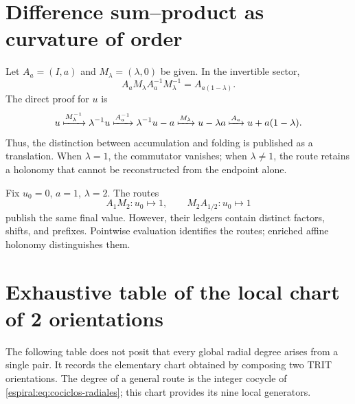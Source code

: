 \section{Difference sum--product as curvature of order}

Let \(A_a=(I,a)\) and \(M_\lambda=(\lambda,0)\) be given. In the invertible sector,
\[
 A_aM_\lambda A_a^{-1}M_\lambda^{-1}
 =A_{a(1-\lambda)}.
\]
The direct proof for \(u\) is
\[
 u\xmapsto{M_\lambda^{-1}}\lambda^{-1}u
 \xmapsto{A_a^{-1}}\lambda^{-1}u-a
 \xmapsto{M_\lambda}u-\lambda a
 \xmapsto{A_a}u+a(1-\lambda).
\]
Thus, the distinction between accumulation and folding is published as a
translation. When \(\lambda=1\), the commutator vanishes; when
\(\lambda\neq1\), the route retains a holonomy that cannot be reconstructed
from the endpoint alone.

\begin{example}
Fix \(u_0=0\), \(a=1\), \(\lambda=2\). The routes
\[
 A_1M_2:u_0\longmapsto1,
 \qquad
 M_2A_{1/2}:u_0\longmapsto1
\]
publish the same final value. However, their ledgers contain distinct factors,
shifts, and prefixes. Pointwise evaluation identifies the
routes; enriched affine holonomy distinguishes them.
\end{example}

\section{Exhaustive table of the local chart of 2 orientations}

The following table does not posit that every global radial degree arises from a
single pair. It records the elementary chart obtained by composing two TRIT
orientations. The degree of a general route is the integer cocycle of
\cref{espiral:eq:cociclos-radiales}; this chart provides its nine local
generators.

